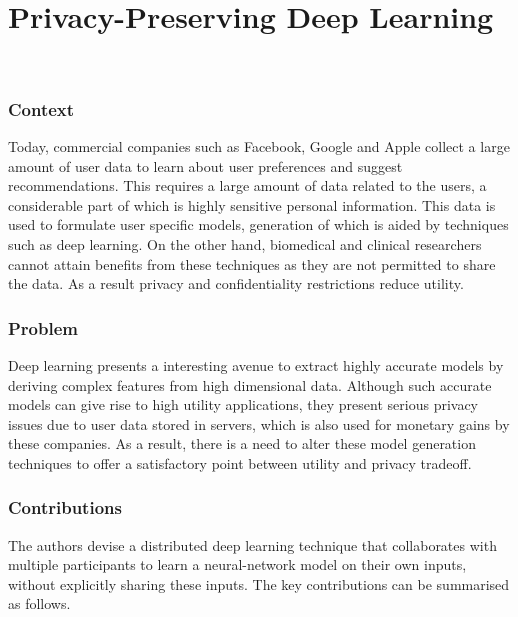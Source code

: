 \newpage
\section{Privacy-Preserving Deep Learning~\cite{Shokri:2015:PDL:2810103.2813687}}~\label{lect5}

\subsubsection*{Context}

Today, commercial companies such as Facebook, Google and Apple collect a large amount of user data to learn 
about user preferences and suggest recommendations. This requires a large amount of data related to the users, 
a considerable part of which is highly sensitive personal information. This data is used to formulate user specific 
models, generation of which is aided by techniques such as deep learning. On the other hand, biomedical and 
clinical researchers cannot attain benefits from these techniques as they are not permitted to share the data. As 
a result privacy and confidentiality restrictions reduce utility. 

\subsubsection*{Problem}

Deep learning presents a interesting avenue to extract highly accurate models by deriving complex features from high
dimensional data. Although such accurate models can give rise to high utility applications, they present serious
privacy issues due to user data stored in servers, which is also used for monetary gains by these companies. As 
a result, there is a need to alter these model generation techniques to offer a satisfactory point between utility
and privacy tradeoff.

\subsubsection*{Contributions}

The authors devise a distributed deep learning technique that collaborates with multiple participants to learn a 
neural-network model on their own inputs, without explicitly sharing these inputs. The key contributions can be 
summarised as follows.


